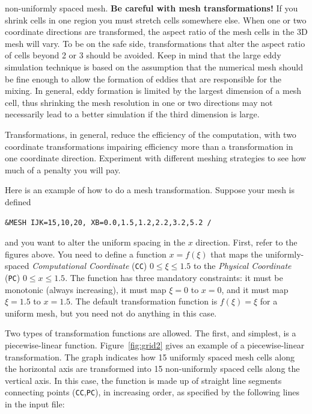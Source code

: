 \documentclass[11pt]{book}
\newcommand{\ct}{\tt\small}
\begin{document}
non-uniformly spaced mesh. {\bf Be careful with mesh transformations!}  If you shrink cells in one
region you must stretch cells somewhere else. When one
or two coordinate directions are transformed, the aspect ratio of the
mesh cells in the 3D mesh will vary. To be on the safe side, transformations
that alter the aspect ratio of cells beyond 2 or 3 should be avoided.
Keep in mind that the large eddy simulation technique is based on the
assumption that the numerical mesh should be fine enough to allow the formation
of eddies that are responsible for the mixing. In general, eddy formation
is limited by the largest dimension of a mesh cell, thus shrinking the
mesh resolution in one or two directions may not necessarily lead to a better
simulation if the third dimension is large.

\begin{warning}
\noindent
Transformations, in general, reduce the efficiency of the computation,
with two coordinate transformations impairing efficiency more
than a transformation in one coordinate direction. Experiment with different meshing
strategies to see how much of a penalty you will pay.
\end{warning}

\noindent
Here is an example of how to do a mesh transformation. Suppose your mesh is defined

\footnotesize
\begin{verbatim}
&MESH IJK=15,10,20, XB=0.0,1.5,1.2,2.2,3.2,5.2 /
\end{verbatim}
\normalsize

\noindent
and you want to alter the uniform spacing in the $x$ direction.
First, refer to the figures above.
You need to define a function $x = f(\xi)$ that maps the uniformly-spaced
{\em Computational Coordinate} ({\ct CC}) $0 \le \xi \le 1.5$
to the {\em Physical Coordinate} ({\ct PC}) $0 \le x \le 1.5$.
The function has three mandatory constraints: it must be monotonic (always increasing),
it must map $\xi=0$ to $x=0$, and it must map $\xi=1.5$ to $x=1.5$.
The default transformation function is $f(\xi) = \xi$ for a uniform mesh, but you need not do
anything in this case.

Two types of transformation functions are allowed. The first, and
simplest, is a piecewise-linear function.
Figure~\ref{fig:grid2} gives an example of a piecewise-linear transformation.
The graph indicates how 15 uniformly spaced mesh cells
along the horizontal axis are transformed into 15 non-uniformly spaced cells along the vertical axis.
In this case, the function is made up of straight line segments
connecting points ({\ct CC},{\ct PC}), in increasing order, as specified by the following lines in the input file:
\end{document}
